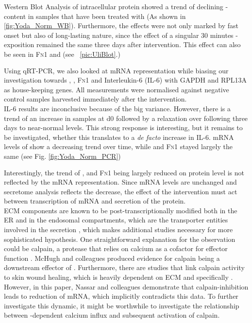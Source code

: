 Western Blot Analysis of intracellular protein showed a trend of declining \colone-content in samples that have been treated with \Yoda{} (As shown in \ref{fig:Yoda_Norm_WB}). Furthermore, the effects were not only marked by fast onset but also of long-lasting nature, since the effect of a singular 30 minutes \Yoda{}-exposition remained the same three days after intervention. This effect can also be seen in \textsc{Fn1} and \colthree{} (see ~\vref{pic:UliBlot}.) \par

Using qRT-PCR, we also looked at mRNA representation while biasing our investigation towards \colone{}, \colthree{}, \textsc{Fn}1 and Interleukin-6 (IL-6) with GAPDH and RPL13A as house-keeping genes. All measurements were normalised against negative control samples harvested immediately after the intervention. \\
IL-6 results are inconclusive because of the big variance. However, there is a trend of an increase in \Yoda{} samples at d0 followed by a relaxation over following three days to near-normal levels. This strong response is interesting, but it remains to be investigated, whether this translates to a \textit{de facto} increase in IL-6. mRNA levels of \colone{} show a decreasing trend over time, while \colthree and \textsc{Fn}1 stayed largely the same (see Fig. \ref{fig:Yoda_Norm_PCR})\\\par

Interestingly, the trend of \colone{}, \colthree{} and \textsc{Fn1} being largely reduced on protein level is not reflected by the mRNA representation. Since mRNA levels are unchanged and secretome analysis reflects the decrease, the effect of the intervention must act between transcription of mRNA and secretion of the protein. \\
ECM components are known to be post-transcriptionally modified both in the ER and in the endosomal compartments, which are the transporter entities involved in the secretion \cite{Ishida2011, Zeltz2014}, which makes additional studies necessary for more sophisticated hypothesis. One straightforward explanation for the observation could be calpain, a protease that relies on calcium as a cofactor for effector function \cite{Goll2003}. McHugh and colleagues produced evidence for calpain being a downstream effector of \Piezo{} \cite{McHugh2010}. Furthermore, there are studies that link calpain activity to skin wound healing, which is heavily dependent on ECM and specifically \colone{} \cite{Nassar2012}. However, in this paper, Nassar and colleagues demonstrate that calpain-inhibition leads to reduction of \colone{} mRNA, which implicitly contradicts this data. To further investigate this dynamic, it might be worthwhile to investigate the relationship between \Piezo{}-dependent calcium influx and subsequent activation of calpain. \par

